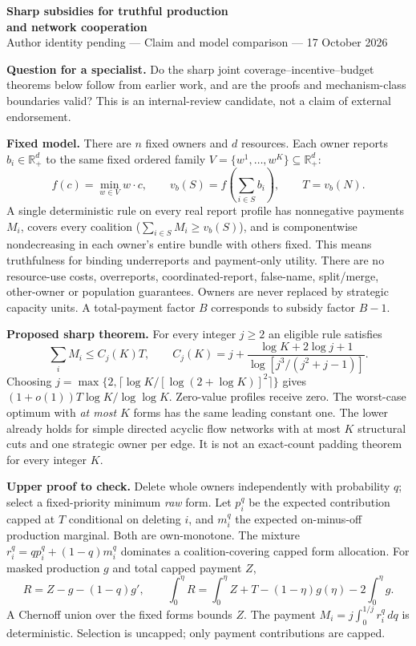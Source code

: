 \documentclass[11pt]{article}
\begin{document}
\begin{center}
{\Large\bfseries Sharp subsidies for truthful production\\and network cooperation}\\[5pt]
Author identity pending --- Claim and model comparison --- 17 October 2026
\end{center}
\textbf{Question for a specialist.} Do the sharp joint coverage--incentive--budget
theorems below follow from earlier work, and are the proofs and mechanism-class boundaries valid?
This is an internal-review candidate, not a claim of external endorsement.

\textbf{Fixed model.} There are $n$ fixed owners and $d$ resources. Each owner
reports $b_i\in\mathbb R_+^d$ to the same fixed ordered family
$V=\{w^1,\ldots,w^K\}\subseteq\mathbb R_+^d$:
\[
 f(c)=\min_{w\in V}w\cdot c,\qquad
 v_b(S)=f\left(\sum_{i\in S}b_i\right),\qquad T=v_b(N).
\]
A single deterministic rule on every real report profile has nonnegative
payments $M_i$, covers every coalition ($\sum_{i\in S}M_i\ge v_b(S)$), and
is componentwise nondecreasing in each owner's entire bundle with others fixed.
This means truthfulness for binding underreports and payment-only utility.
There are no resource-use costs, overreports, coordinated-report, false-name,
split/merge, other-owner or population guarantees. Owners are never replaced
by strategic capacity units. A total-payment factor $B$ corresponds to subsidy
factor $B-1$.

\textbf{Proposed sharp theorem.} For every integer $j\ge2$ an eligible rule satisfies
\[
 \sum_iM_i\le C_j(K)T,\qquad
 C_j(K)=j+\frac{\log K+2\log j+1}{\log[j^3/(j^2+j-1)]}.
\]
Choosing $j=\max\{2,\lceil\log K/[\log(2+\log K)]^2\rceil\}$ gives
$(1+o(1))T\log K/\log\log K$. Zero-value profiles receive zero.
The worst-case optimum with \emph{at most} $K$ forms has the same leading
constant one. The lower already holds for simple directed acyclic flow
networks with at most $K$ structural cuts and one strategic owner per edge.
It is not an exact-count padding theorem for every integer $K$.

\textbf{Upper proof to check.} Delete whole owners independently with probability
$q$; select a fixed-priority minimum \emph{raw} form. Let $p_i^q$ be the
expected contribution capped at $T$ conditional on deleting $i$, and $m_i^q$
the expected on-minus-off production marginal. Both are own-monotone.
The mixture $r_i^q=qp_i^q+(1-q)m_i^q$ dominates a coalition-covering capped
form allocation. For masked production $g$ and total capped payment $Z$,
\[
 R=Z-g-(1-q)g',\qquad
 \int_0^\eta R=\int_0^\eta Z+T-(1-\eta)g(\eta)-2\int_0^\eta g.
\]
A Chernoff union over the fixed forms bounds $Z$. The payment
$M_i=j\int_0^{1/j}r_i^q\,dq$ is deterministic. Selection is uncapped;
only payment contributions are capped.
\end{document}
